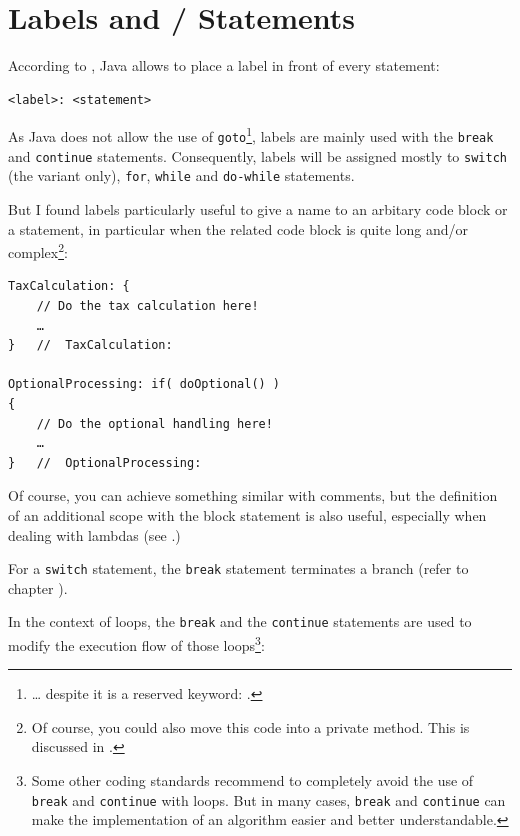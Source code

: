 \section{Labels and / Statements}\label{sec:LabelsAndBreakStatements}
According to \autocite{ORACLE_DOC_LANGUAGE_SPECIFICATION:LabeledStatements}, Java allows to place a label in front of every statement:
\begin{lstlisting}
<label>: <statement>
\end{lstlisting}

As Java does not allow the use of \lstinline|goto|\footnote{… despite it is a reserved keyword: \autocite{ORACLE_DOC_LANGUAGE_SPECIFICATION:Keywords}.}, labels are mainly used with the \lstinline|break| and \lstinline|continue| statements. Consequently, labels will be assigned mostly to \lstinline|switch| (the  variant only), \lstinline|for|, \lstinline|while| and \lstinline|do-while| statements.

But I found labels particularly useful to give a name to an arbitary code block or a statement, in particular when the related code block is quite long and/or complex\footnote{Of course, you could also move this code into a private method. This is discussed in .}:
\begin{lstlisting}
TaxCalculation: {
    // Do the tax calculation here!
    …
}   //  TaxCalculation:

OptionalProcessing: if( doOptional() )
{
    // Do the optional handling here!
    …
}   //  OptionalProcessing:    
\end{lstlisting}

Of course, you can achieve something similar with comments, but the definition of an additional scope with the block statement is also useful, especially when dealing with lambdas (see .)

For a \lstinline|switch| statement, the \lstinline|break| statement terminates a branch (refer to chapter ).

In the context of loops, the \lstinline|break| and the \lstinline|continue| statements are used to modify the execution flow of those loops\footnote{Some other coding standards recommend to completely avoid the use of \lstinline|break| and \lstinline|continue| with loops. But in many cases, \lstinline|break| and \lstinline|continue| can make the implementation of an algorithm easier and better understandable.}:

